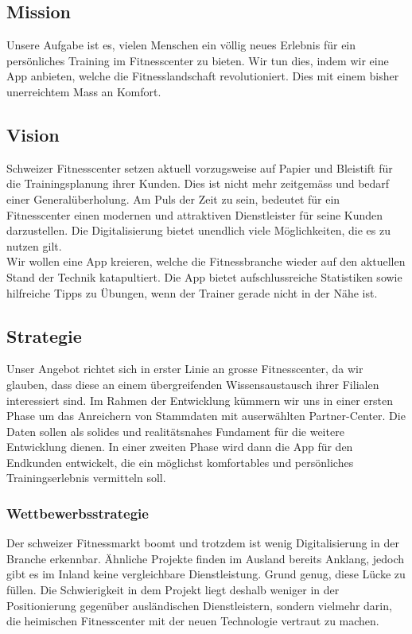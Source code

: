 \subsection{Mission}
Unsere Aufgabe ist es, vielen Menschen ein völlig neues Erlebnis für ein persönliches Training im Fitnesscenter zu bieten. Wir tun dies, indem wir eine App anbieten, welche die Fitnesslandschaft revolutioniert. Dies mit einem bisher unerreichtem Mass an Komfort.

\subsection{Vision}
Schweizer Fitnesscenter setzen aktuell vorzugsweise auf Papier und Bleistift für die Trainingsplanung ihrer Kunden. Dies ist nicht mehr zeitgemäss und bedarf einer Generalüberholung. Am Puls der Zeit zu sein, bedeutet für ein Fitnesscenter einen modernen und attraktiven Dienstleister für seine Kunden darzustellen. Die Digitalisierung bietet unendlich viele Möglichkeiten, die es zu nutzen gilt. \\
Wir wollen eine App kreieren, welche die Fitnessbranche wieder auf den aktuellen Stand der Technik katapultiert. Die App bietet aufschlussreiche Statistiken sowie hilfreiche Tipps zu Übungen, wenn der Trainer gerade nicht in der Nähe ist.

\subsection{Strategie}
Unser Angebot richtet sich in erster Linie an grosse Fitnesscenter, da wir glauben, dass diese an einem übergreifenden Wissensaustausch ihrer Filialen interessiert sind. Im Rahmen der Entwicklung kümmern wir uns in einer ersten Phase um das Anreichern von Stammdaten mit auserwählten Partner-Center. Die Daten sollen als solides und realitätsnahes Fundament für die weitere Entwicklung dienen. In einer zweiten Phase wird dann die App für den Endkunden entwickelt, die ein möglichst komfortables und persönliches Trainingserlebnis vermitteln soll. 

\subsubsection{Wettbewerbsstrategie}
Der schweizer Fitnessmarkt boomt und trotzdem ist wenig Digitalisierung in der Branche erkennbar. Ähnliche Projekte finden im Ausland bereits Anklang, jedoch gibt es im Inland keine vergleichbare Dienstleistung. Grund genug, diese Lücke zu füllen. Die Schwierigkeit in dem Projekt liegt deshalb weniger in der Positionierung gegenüber ausländischen Dienstleistern, sondern vielmehr darin, die heimischen Fitnesscenter mit der neuen Technologie vertraut zu machen.


